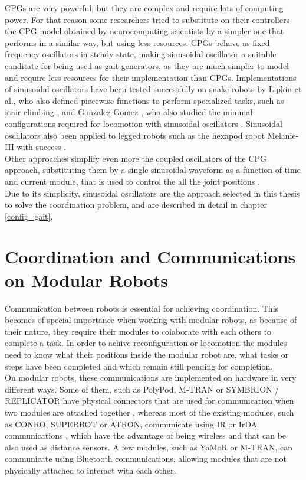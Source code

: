 CPGs are very powerful, but they are complex and require lots of computing power. For that reason some researchers tried to substitute on their controllers the CPG model obtained by neurocomputing scientists by a simpler one that performs in a similar way, but using less resources. CPGs behave as fixed frequency oscillators in steady state, making sinusoidal oscillator a suitable canditate for being used as gait generators, as they are much simpler to model and require less resources for their implementation than CPGs. Implementations of sinusoidal oscillators have been tested successfully on snake robots by Lipkin et al., who also defined piecewise functions to perform specialized tasks, such as stair climbing \cite{Lipkin2007}, and Gonzalez-Gomez \cite{Gonzalez-Gomez2008}, who also studied the minimal configurations required for locomotion with sinusoidal oscillators \cite{Gonzalez-Gomez2006}. Sinusoidal oscillators also been applied to legged robots such as the hexapod robot Melanie-III with success \cite{AlonsoPuig2005}.\\

Other approaches simplify even more the coupled oscillators of the CPG approach, substituting them by a single sinusoidal waveform as a function of time and current module, that is used to control the all the joint positions \cite{Tesch2009}.\\

Due to its simplicity, sinusoidal oscillators are the approach selected in this thesis to solve the coordination problem, and are described in detail in chapter \ref{config_gait}.\\

\section{Coordination and Communications on Modular Robots}
\label{state_art_coordination}

Communication between robots is essential for achieving coordination. This becomes of special importance when working with modular robots, as because of their nature, they require their modules to colaborate with each others to complete a task. In order to achive reconfiguration or locomotion the modules need to know what their positions inside the modular robot are, what tasks or steps have been completed and which remain still pending for completion. \\

On modular robots, these communications are implemented on hardware in very different ways. Some of them, such as PolyPod, M-TRAN or SYMBRION / REPLICATOR have physical connectors that are used for communication when two modules are attached together \cite{Yim2000, Kurokawa2008, Liedke2011}, whereas most of the existing modules, such as CONRO, SUPERBOT or ATRON, communicate using IR or IrDA communications \cite{Castano2000, Salemi2006, Brandt2007}, which have the advantage of being wireless and that can be also used as distance sensors. A few modules, such as YaMoR or M-TRAN, can communicate using Bluetooth communications, allowing modules that are not physically attached to interact with each other\cite{ Mockel2006, Kurokawa2008}.\\

